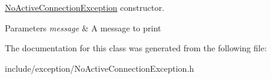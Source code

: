 \hyperlink{class_f_t_p_1_1_no_active_connection_exception}{No\-Active\-Connection\-Exception} constructor. 


\begin{DoxyParams}{Parameters}
{\em message} & A message to print \\
\hline
\end{DoxyParams}


The documentation for this class was generated from the following file\-:\begin{DoxyCompactItemize}
\item 
include/exception/No\-Active\-Connection\-Exception.\-h\end{DoxyCompactItemize}
